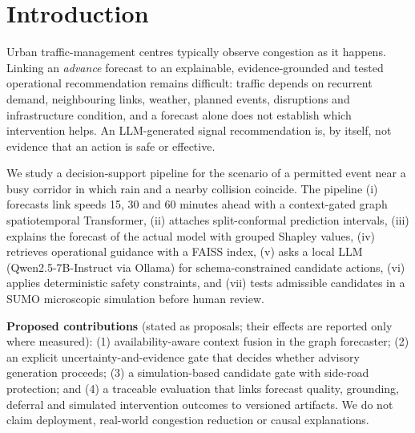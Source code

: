 \section{Introduction}
\label{sec:intro}
Urban traffic-management centres typically observe congestion as it happens. Linking an \emph{advance} forecast to an
explainable, evidence-grounded and tested operational recommendation remains difficult: traffic depends on recurrent
demand, neighbouring links, weather, planned events, disruptions and infrastructure condition, and a forecast alone does
not establish which intervention helps. An LLM-generated signal recommendation is, by itself, not evidence that an
action is safe or effective.

We study a decision-support pipeline for the scenario of a permitted event near a busy corridor in which rain and a
nearby collision coincide. The pipeline (i) forecasts link speeds 15, 30 and 60 minutes ahead with a context-gated
graph spatiotemporal Transformer, (ii) attaches split-conformal prediction intervals, (iii) explains the forecast of
the actual model with grouped Shapley values, (iv) retrieves operational guidance with a FAISS index, (v) asks a local
LLM (Qwen2.5-7B-Instruct via Ollama) for schema-constrained candidate actions, (vi) applies deterministic safety
constraints, and (vii) tests admissible candidates in a SUMO microscopic simulation before human review.

\textbf{Proposed contributions} (stated as proposals; their effects are reported only where measured):
(1) availability-aware context fusion in the graph forecaster; (2) an explicit uncertainty-and-evidence gate that
decides whether advisory generation proceeds; (3) a simulation-based candidate gate with side-road protection; and
(4) a traceable evaluation that links forecast quality, grounding, deferral and simulated intervention outcomes to
versioned artifacts. We do not claim deployment, real-world congestion reduction or causal explanations.

